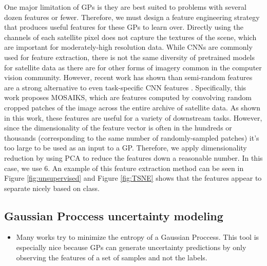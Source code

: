 One major limitation of GPs is they are best suited to problems with several dozen features or fewer. Therefore, we must design a feature engineering strategy that produces useful features for these GPs to learn over. Directly using the channels of each satellite pixel does not capture the textures of the scene, which are important for moderately-high resolution data. While CNNs are commonly used for feature extraction, there is not the same diversity of pretrained models for satellite data as there are for other forms of imagery common in the computer vision community. However, recent work has shown than semi-random features are a strong alternative to even task-specific CNN features \cite{Rolf2021}. Specifically, this work proposes MOSAIKS, which are features computed by convolving random cropped patches of the image across the entire archive of satellite data. As shown in this work, these features are useful for a variety of downstream tasks. However, since the dimensionality of the feature vector is often in the hundreds or thousands (corresponding to the same number of randomly-sampled patches) it's too large to be used as an input to a GP. Therefore, we apply dimensionality reduction by using PCA to reduce the features down a reasonable number. In this case, we use 6. An example of this feature extraction method can be seen in Figure \ref{fig:unsupervised} and Figure \ref{fig:TSNE} shows that the features appear to separate nicely based on class.


    
\subsection{Gaussian Proccess uncertainty modeling}
\begin{itemize}
    \item Many works try to minimize the entropy of a Gaussian Proccess. This tool is especially nice because GPs can generate uncertainty predictions by only observing the features of a set of samples and not the labels.
\end{itemize}
